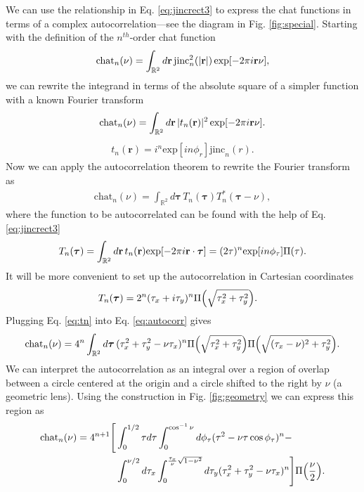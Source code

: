 \documentclass[]{osa-article}
\let\originalleft\left
\let\originalright\right
\renewcommand{\left}{\mathopen{}\mathclose\bgroup\originalleft}
\renewcommand{\right}{\aftergroup\egroup\originalright}
\providecommand{\mb}[1]{\mathbf{#1}}
\providecommand{\mbb}[1]{\mathbb{#1}}
\providecommand{\bs}[1]{\boldsymbol{#1}}
\begin{document}
We can use the relationship in Eq. \eqref{eq:jincrect3} to express the chat
functions in terms of a complex autocorrelation---see the diagram in Fig. \ref{fig:special}. Starting with the definition of
the $n^{th}$-order chat function
\begin{align}
  \text{chat}_{n}(\nu) = \int_{\mbb{R}^2}d\mb{r}\, \text{jinc}_{n}^2(|\mb{r}|)\, \text{exp}\left[-2\pi i\mb{r}\nu\right],  \label{eq:ftA}
\end{align}
we can rewrite the integrand in terms of the absolute square of a simpler
function with a known Fourier transform
\begin{align}
  \text{chat}_{n}(\nu) = \int_{\mbb{R}^2}d\mb{r}\, |t_n(\mb{r})|^2\, \text{exp}\left[-2\pi i\mb{r}\nu\right].  \label{eq:ftB}
\end{align}
\begin{align}
  t_n(\mb{r}) = i^n\text{exp}[in\phi_r]\text{jinc}_{n}(r).
\end{align}
Now we can apply the autocorrelation theorem to rewrite the Fourier transform as
\begin{align}
  \text{chat}_{n}(\nu) = \int_{\mbb{R}^2}d\bs{\tau}\, T_n(\bs{\tau})T^*_n(\bs{\tau} - \nu), \label{eq:autocorr}
\end{align}
where the function to be autocorrelated can be found with the help of Eq. \eqref{eq:jincrect3}
\begin{align}
  T_n(\bs{\tau}) = \int_{\mbb{R}^2}d\mb{r}\, t_n(\mb{r})\text{exp}\left[-2\pi i\mb{r}\cdot\bs{\tau}\right] = (2\tau)^n\text{exp}[in\phi_\tau]\Pi\left(\tau\right). \label{eq:tau}
\end{align}
It will be more convenient to set up the autocorrelation in Cartesian coordinates 
\begin{align}
  T_n(\bs{\tau}) &= 2^n(\tau_x + i\tau_y)^{n}\Pi\left(\sqrt{\tau_x^2 + \tau_y^2}\right). \label{eq:tn}
\end{align}
Plugging Eq. \eqref{eq:tn} into Eq. \eqref{eq:autocorr} gives
\begin{align}
  \text{chat}_{n}(\nu) = 4^n\int_{\mbb{R}^2}d\bs{\tau}\, (\tau_x^2 + \tau_y^2 - \nu\tau_x)^{n}\Pi\left(\sqrt{\tau_x^2 + \tau_y^2}\right)\Pi\left(\sqrt{(\tau_x - \nu)^2 + \tau_y^2}\right).
\end{align}
We can interpret the autocorrelation as an integral over a region of overlap
between a circle centered at the origin and a circle shifted to the right by
$\nu$ (a geometric lens). Using the construction in Fig. \ref{fig:geometry} we
can express this region as
\begin{align}
  \text{chat}_{n}(\nu) = 4^{n+1}\Bigg[&\int_0^{1/2}\tau d\tau\int_0^{\cos^{-1}\nu}d\phi_{\tau}(\tau^2 - \nu\tau\cos\phi_{\tau})^{n} -\nonumber \\ &\int_{0}^{\nu/2}d\tau_x\int_0^{\frac{\tau_x}{\nu}\sqrt{1 - \nu^2}}d\tau_y(\tau_x^2 + \tau_y^2 - \nu\tau_x)^{n}\Bigg]\Pi\left(\frac{\nu}{2}\right).
\end{align}
\end{document}

